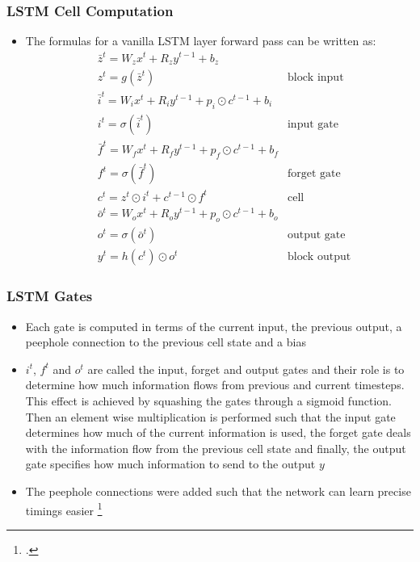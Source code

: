\documentclass{beamer}
\begin{document}
\begin{frame}
\frametitle{LSTM Cell Computation}
\begin{itemize}
	\item The formulas for a vanilla LSTM layer forward pass can be written as:
	\begin{align*}
		&\bar{z}^t = W_z x^t + R_z y^{t-1} + b_z& \\
		&z^t = g(\bar{z}^t)& \text{block input} \\
		&\bar{i}^t = W_i x^t + R_i y^{t-1} + p_i \odot c^{t-1} + b_i& \\
		&i^t = \sigma (\bar{i}^t)& \text{input gate} \\
		&\bar{f}^t = W_f x^t + R_f y^{t-1} + p_f \odot c^{t-1} + b_f& \\
		&f^t = \sigma (\bar{f}^t)& \text{forget gate} \\
		&c^t = z^t \odot i^t + c^{t-1} \odot f^t& \text{cell} \\
		&\bar{o}^t = W_o x^t + R_o y^{t-1} + p_o \odot c^{t-1} + b_o& \\
		&o^t = \sigma (\bar{o}^t)& \text{output gate} \\
		&y^t = h(c^t) \odot o^t& \text{block output}
	\end{align*}
\end{itemize}
\end{frame}

\begin{frame}
\frametitle{LSTM Gates}
\begin{itemize}
	\item Each gate is computed in terms of the current input, the previous output, a peephole connection to the previous cell state and a bias
	\item \(i^t\), \(f^t\) and \(o^t\) are called the input, forget and output gates and their role is to determine how much information flows from previous and current timesteps. This effect is achieved by squashing the gates through a sigmoid function. Then an element wise multiplication is performed such that the input gate determines how much of the current information is used, the forget gate deals with the information flow from the previous cell state and finally, the output gate specifies how much information to send to the output \(y\)
	\item The peephole connections were added such that the network can learn precise timings easier \footcite{Gers:2003:LPT:944919.944925}
\end{itemize}
\end{frame}
\end{document}
